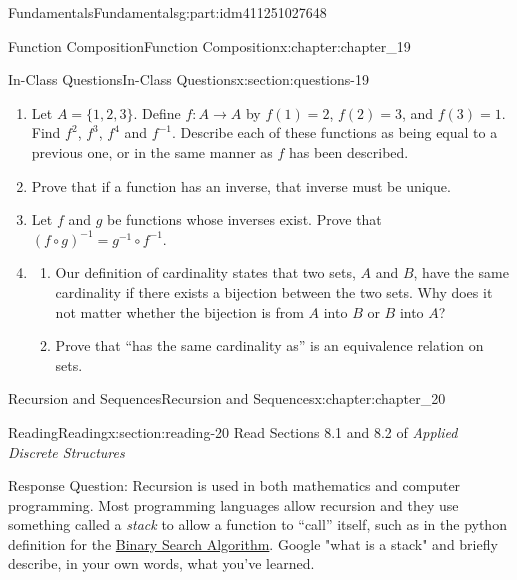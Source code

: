 \documentclass[oneside,10pt,]{book}
\numberwithin{equation}{section}
\begin{document}
\begin{partptx}{Fundamentals}{}{Fundamentals}{}{}{g:part:idm411251027648}
\begin{chapterptx}{Function Composition}{}{Function Composition}{}{}{x:chapter:chapter_19}
%
\begin{sectionptx}{In-Class Questions}{}{In-Class Questions}{}{}{x:section:questions-19}
%
\begin{enumerate}[label=\arabic*.]
\item{}Let \(A = \{1, 2, 3\}\). Define \(f:A\rightarrow A\) by \(f(1) = 2\), \(f(2) = 3\), and \(f(3) = 1\). Find \(f^2\), \(f^3\), \(f^4\) and \(f^{-1}\).  Describe each of these functions as being equal to a previous one, or in the same manner as \(f\) has been described.%
\item{}Prove that if a function has an inverse, that inverse must be unique.%
\item{}Let \(f\) and \(g\) be functions whose inverses exist. Prove that \((f\circ g)^{-1}= g^{-1}\circ f^{-1}\).%
\item{}%
\begin{enumerate}[label=(\alph*)]
\item{}Our definition of cardinality states that two sets, \(A\) and \(B\), have the same cardinality if there exists a bijection between the two sets. Why does it not matter whether the bijection is from \(A\) into \(B\) or \(B\) into \(A\)?%
\item{}Prove that ``has the same cardinality as'' is an equivalence relation on sets.%
\end{enumerate}
%
\end{enumerate}
%
\end{sectionptx}
\end{chapterptx}
%
\typeout{************************************************}
\typeout{************************************************}
%
\begin{chapterptx}{Recursion and Sequences}{}{Recursion and Sequences}{}{}{x:chapter:chapter_20}
%
%
%
%
\typeout{************************************************}
\typeout{************************************************}
%
\begin{sectionptx}{Reading}{}{Reading}{}{}{x:section:reading-20}
Read  Sections 8.1 and 8.2 of \emph{Applied Discrete Structures}%
\par
Response Question: Recursion is used in both mathematics and computer programming. Most programming languages allow recursion and they use something called a \emph{stack} to allow a function to ``call'' itself, such as in the python definition for the \hyperref[x:section:s-bsa]{Binary Search Algorithm}.  Google "what is a stack" and briefly describe, in your own words, what you've learned.%

\end{sectionptx}
\end{chapterptx}
\end{partptx}
\end{document}
